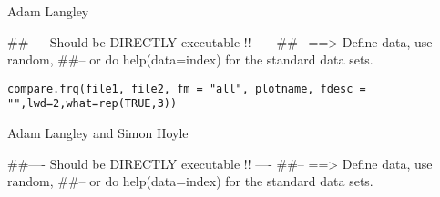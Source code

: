 \documentclass[a4paper]{book}
\begin{document}
%
\begin{Author}\relax
Adam Langley

\end{Author}
%
\begin{Examples}
\begin{ExampleCode}
##---- Should be DIRECTLY executable !! ----
##-- ==>  Define data, use random,
##--	or do  help(data=index)  for the standard data sets.

\end{ExampleCode}
\end{Examples}
%
\begin{Usage}
\begin{verbatim}
compare.frq(file1, file2, fm = "all", plotname, fdesc = "",lwd=2,what=rep(TRUE,3))
\end{verbatim}
\end{Usage}
%
\begin{Arguments}
\begin{ldescription}
\item[\code{file1}] 


\item[\code{file2}] 


\item[\code{fm}] 


\item[\code{plotname}] 


\item[\code{fdesc}] 


\item[\code{lwd}] 


\item[\code{what}] 


\end{ldescription}
\end{Arguments}
%
\begin{Author}\relax
Adam Langley and Simon Hoyle

\end{Author}
%
\begin{Examples}
\begin{ExampleCode}
##---- Should be DIRECTLY executable !! ----
##-- ==>  Define data, use random,
##--	or do  help(data=index)  for the standard data sets.

\end{ExampleCode}
\end{Examples}
\end{document}
